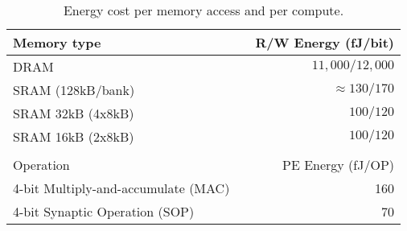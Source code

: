 \begin{table}[t]
\centering
\caption{Energy cost per memory access and per compute.}
\label{tab:mem_mac_energy}
\begin{tabular}{@{}lrr@{}}
\toprule
Memory type & & R/W Energy (fJ/bit)  \\ \midrule
DRAM & & $11,000 / 12,000$  \\
SRAM (128kB/bank) & & $\approx 130 / 170$  \\
SRAM 32kB (4x8kB) & & $100 / 120$   \\
SRAM 16kB (2x8kB) & & $100 / 120$  \\ \midrule
 &  &  \\ \midrule
Operation & & PE Energy (fJ/OP) \\ \midrule
4-bit Multiply-and-accumulate (MAC) & & 160   \\
4-bit Synaptic Operation (SOP) & & 70  \\ \bottomrule
\end{tabular}
\end{table}
